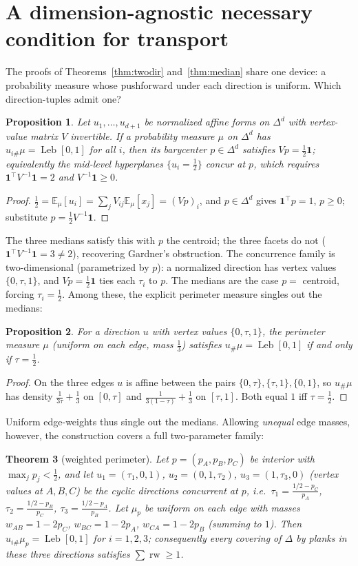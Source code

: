 \documentclass[11pt,reqno]{amsart}
\theoremstyle{plain}
\newtheorem{theorem}{Theorem}[section]
\newtheorem{proposition}[theorem]{Proposition}
\theoremstyle{definition}
\theoremstyle{remark}
\newcommand{\rw}{\operatorname{rw}}
\newcommand{\Leb}{\operatorname{Leb}}
\begin{document}
\section{A dimension-agnostic necessary condition for transport}\label{sec:concur}
The proofs of Theorems~\ref{thm:twodir} and~\ref{thm:median} share one device: a
probability measure whose pushforward under each direction is uniform. Which
direction-tuples admit one?
\begin{proposition}\label{prop:concur}
Let $u_1,\dots,u_{d+1}$ be normalized affine forms on $\Delta^d$ with vertex-value
matrix $V$ invertible. If a probability measure $\mu$ on $\Delta^d$ has
$u_{i\#}\mu=\Leb[0,1]$ for all $i$, then its barycenter $p\in\Delta^d$ satisfies
$Vp=\tfrac12\mathbf 1$; equivalently the mid-level hyperplanes $\{u_i=\tfrac12\}$
concur at $p$, which requires $\mathbf 1^\top V^{-1}\mathbf 1=2$ and
$V^{-1}\mathbf 1\ge0$.
\end{proposition}
\begin{proof}
$\tfrac12=\mathbb E_\mu[u_i]=\sum_j V_{ij}\mathbb E_\mu[x_j]=(Vp)_i$, and
$p\in\Delta^d$ gives $\mathbf 1^\top p=1$, $p\ge0$; substitute $p=\tfrac12V^{-1}\mathbf1$.
\end{proof}
The three medians satisfy this with $p$ the centroid; the three facets do not
($\mathbf 1^\top V^{-1}\mathbf 1=3\ne2$), recovering Gardner's obstruction. The
concurrence family is two-dimensional (parametrized by $p$): a normalized direction
has vertex values $\{0,\tau,1\}$, and $Vp=\tfrac12\mathbf1$ ties each $\tau_i$ to $p$.
The medians are the case $p=$ centroid, forcing $\tau_i=\tfrac12$. Among these, the
explicit perimeter measure singles out the medians:
\begin{proposition}\label{prop:tauhalf}
For a direction $u$ with vertex values $\{0,\tau,1\}$, the perimeter measure $\mu$
(uniform on each edge, mass $\tfrac13$) satisfies $u_\#\mu=\Leb[0,1]$ if and only if
$\tau=\tfrac12$.
\end{proposition}
\begin{proof}
On the three edges $u$ is affine between the pairs $\{0,\tau\},\{\tau,1\},\{0,1\}$,
so $u_\#\mu$ has density $\tfrac1{3\tau}+\tfrac13$ on $[0,\tau]$ and
$\tfrac1{3(1-\tau)}+\tfrac13$ on $[\tau,1]$. Both equal $1$ iff $\tau=\tfrac12$.
\end{proof}
Uniform edge-weights thus single out the medians. Allowing \emph{unequal} edge
masses, however, the construction covers a full two-parameter family:
\begin{theorem}[weighted perimeter]\label{thm:wper}
Let $p=(p_A,p_B,p_C)$ be interior with $\max_j p_j<\tfrac12$, and let
$u_1=(\tau_1,0,1)$, $u_2=(0,1,\tau_2)$, $u_3=(1,\tau_3,0)$ (vertex values at
$A,B,C$) be the cyclic directions concurrent at $p$, i.e.\
$\tau_1=\frac{1/2-p_C}{p_A}$, $\tau_2=\frac{1/2-p_B}{p_C}$,
$\tau_3=\frac{1/2-p_A}{p_B}$. Let $\mu_p$ be uniform on each edge with masses
$w_{AB}=1-2p_C$, $w_{BC}=1-2p_A$, $w_{CA}=1-2p_B$ (summing to $1$). Then
$u_{i\#}\mu_p=\Leb[0,1]$ for $i=1,2,3$; consequently every covering of $\Delta$ by
planks in these three directions satisfies $\sum\rw\ge1$.
\end{theorem}
\end{document}
